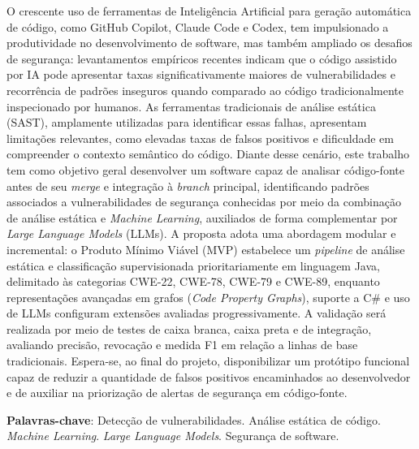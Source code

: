 
\imprimircapa

\begin{resumo}
O crescente uso de ferramentas de Inteligência Artificial para geração automática de código, 
como GitHub Copilot, Claude Code e Codex, tem impulsionado a produtividade no desenvolvimento de software, 
mas também ampliado os desafios de segurança: levantamentos empíricos recentes indicam que o código assistido por IA pode apresentar taxas significativamente maiores de vulnerabilidades e recorrência de padrões inseguros quando comparado ao código tradicionalmente inspecionado por humanos. 
As ferramentas tradicionais de análise estática (SAST), amplamente utilizadas para identificar essas falhas, apresentam limitações relevantes, 
como elevadas taxas de falsos positivos e dificuldade em compreender o contexto semântico do código. 
Diante desse cenário, este trabalho tem como objetivo geral desenvolver um software capaz de analisar código-fonte antes de seu \textit{merge} e integração à \textit{branch} principal, 
identificando padrões associados a vulnerabilidades de segurança conhecidas por meio da combinação de análise estática e \textit{Machine Learning}, auxiliados de forma complementar por \textit{Large Language Models} (LLMs). 
A proposta adota uma abordagem modular e incremental: o Produto Mínimo Viável (MVP) estabelece um \textit{pipeline} de análise estática e classificação supervisionada prioritariamente em linguagem Java, delimitado às categorias CWE-22, CWE-78, CWE-79 e CWE-89, enquanto representações avançadas em grafos (\textit{Code Property Graphs}), suporte a C\# e uso de LLMs configuram extensões avaliadas progressivamente. 
A validação será realizada por meio de testes de caixa branca, caixa preta e de integração, avaliando precisão, revocação e medida F1 em relação a linhas de base tradicionais. 
Espera-se, ao final do projeto, disponibilizar um protótipo funcional capaz de reduzir a quantidade de falsos positivos encaminhados ao desenvolvedor e de auxiliar na priorização de alertas de segurança em código-fonte.

\textbf{Palavras-chave}: Detecção de vulnerabilidades. Análise estática de código. \textit{Machine Learning}. \textit{Large Language Models}. Segurança de software.
\end{resumo}

\enlargethispage{2\baselineskip}
\tableofcontents*
\cleardoublepage
